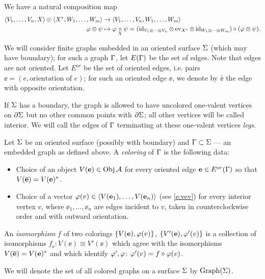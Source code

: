 We have a natural composition map 
\begin{equation}\label{e:composition}
\begin{aligned}
 \langle V_1,\dots,V_n, X\rangle \otimes \langle X^*, W_1,\dots,
W_m\rangle & \to\langle V_1,\dots,V_n, W_1,\dots, W_m\rangle \\
\varphi\otimes\psi & \mapsto \varphi\underset{\scriptstyle X}{\circ}\psi = (\operatorname{id}_{V_1 \otimes \cdots \otimes V_n} \otimes \operatorname{ev}_{X^*} \otimes \operatorname{id}_{W_1 \otimes \cdots \otimes W_m}) \circ (\varphi\otimes\psi).
\end{aligned}
\end{equation}


We will consider finite  graphs embedded in an oriented surface $\Sigma$
(which may have boundary); for such a
graph $\Gamma$, let $E(\Gamma)$ be the set of edges. Note that edges are not
oriented. Let $E^{or}$ be the set of oriented edges, i.e. pairs $\ee=(e,
\text{orientation of } e)$; for such an oriented edge $\ee$, we denote by
$\bar{\ee}$ the edge with opposite orientation.

If $\Sigma$ has a boundary, the graph is allowed to have uncolored one-valent
vertices on $\partial \Sigma$ but no other common points with $\partial \Sigma$; all
other  vertices will  be called interior.  We will  call the edges of $\Gamma$
terminating at these  one-valent vertices {\em legs}.   
\begin{defn}\label{d:coloring} Let $\Sigma$ be an oriented surface
(possibly with boundary) and $\Gamma\subset \Sigma$ --- an embedded graph as
defined above.  A {\em coloring} of $\Gamma$ is the
following data:

  \begin{itemize}
    \item Choice of an object $V(\mathbf{e})\in \operatorname{Obj} \mathcal{A}$ for every oriented edge
        $\mathbf{e}\in E^{or}(\Gamma)$ so that $V(\overline{\mathbf{e}})=V(\mathbf{e})^*$.
    \item Choice of a vector $\varphi(v)\in \langle V(\mathbf{e}_1),\dots,V(\mathbf{e}_n)\rangle$ 
      (see \eqref{e:vev})  for    every interior vertex $v$, where 
      $\ee_1, \dots, \ee_n$ are edges incident to $v$, taken in counterclockwise 
      order and with outward orientation. %
\end{itemize}

An {\em isomorphism} $f$ of two colorings $\{V(\mathbf{e}), \varphi(v)\}$, $\{V'(\mathbf{e}), \varphi'(v)\}$ is a collection of isomorphisms $f_\ee \colon V(\ee)\cong 
V'(\ee)$ which  agree  with the isomorphisms $V(\overline{\mathbf{e}})=V(\mathbf{e})^*$ and which 
identify $\varphi', \varphi$:  $\varphi'(v)=f\circ\varphi(v)$. 

We will denote the set of all colored graphs on a surface $\Sigma$ by
$\operatorname{Graph}(\Sigma)$.
\end{defn}

